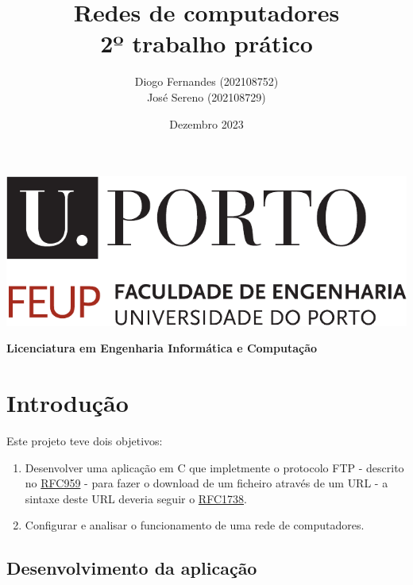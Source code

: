 \documentclass[11pt,a4paper,twocolumn]{report}
\title{%
  Redes de computadores \\
  \large 2º trabalho prático}
\author{%
        Diogo Fernandes (202108752) \\ 
        José Sereno (202108729)}
\date{Dezembro 2023}
\newcommand{\hl}[1]{\textcolor{text-hl}{#1}}
\def\course{Licenciatura em Engenharia Informática e Computação}
\begin{document}
\begin{titlepage}
    \begin{center}
        \includegraphics[width=0.8\linewidth]{images/uporto-feup.pdf} 
        \vspace{1cm}

        \LARGE
        \textbf{\thetitle}
        \vfill

        \large
        \textbf{\course}
        \vspace{0.5cm}

        \large
        \textbf{\theauthor}
        \vspace{0.5cm}

        \large
        \thedate
    \end{center}
\end{titlepage}

\tableofcontents

\chapter{Introdução}

Este projeto teve dois objetivos:
\begin{enumerate}
    \item Desenvolver uma aplicação em \hl{C} que impletmente o protocolo \hl{FTP} - descrito no \href{https://datatracker.ietf.org/doc/html/rfc959}{RFC959} - para fazer o download de um ficheiro através de um \hl{URL} - a sintaxe deste URL deveria seguir o \href{https://datatracker.ietf.org/doc/html/rfc1738}{RFC1738}.
    \item Configurar e analisar o funcionamento de uma rede de computadores.
\end{enumerate}

\section{Desenvolvimento da aplicação}
\end{document}
